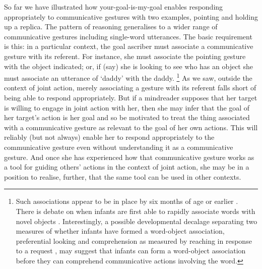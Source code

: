 \documentclass[12pt,a4paper]{extarticle}
\begin{document}
So far we have illustrated how your-goal-is-my-goal enables responding appropriately to communicative gestures with two examples, pointing and holding up a replica.
The pattern of reasoning generalises to a wider range of communicative gestures including single-word utterances.
The basic requirement is this: in a particular context, the goal ascriber must associate a communicative gesture with its referent.
For instance, she must associate the pointing gesture with the object indicated; or, if (say) she is looking to see who has an object she must associate an utterance of `daddy' with the daddy.%
\footnote{
Such associations appear to be in place by six months of age or earlier \citep{tincoff:1999_beginnings_,tincoff:2011}.
There is debate on when infants are first able to rapidly associate words with novel objects \citep{werker:1998_acquisition,friedrich:2011_word_}.
Interestingly,
a possible developmental decalage separating 
two measures of whether infants have formed a word-object association,
preferential looking and comprehension as measured by reaching in response to a request  \citep{gurteen:2011_rapid},
may suggest that
infants can form a word-object association before they can comprehend communicative actions involving the word.
}
As we saw, 
outside the context of joint action,
merely associating a gesture with its referent falls short of being able to respond appropriately.
But if a mindreader supposes that her target is willing to engage in joint action with her,
then she may infer that the goal of her target's action is her goal
and so be motivated to treat the thing associated with a communicative gesture as relevant to the goal of her own actions.
This will reliably (but not always) enable her to respond appropriately to the communicative gesture even without understanding it as a communicative gesture.
And once she has experienced how that communicative gesture works as a tool for guiding others' actions in the context of joint action,
she may be in a position to realise, further, that the same tool can be used in other contexts.
\end{document}
